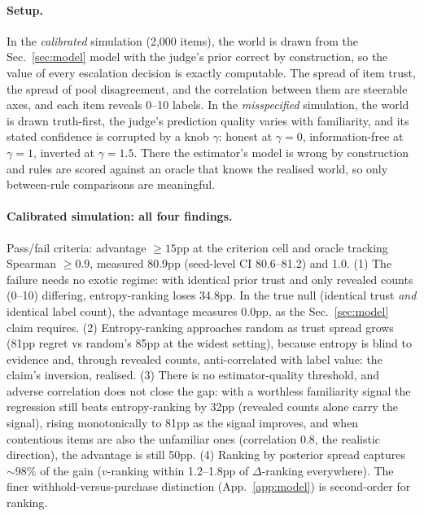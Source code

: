 \documentclass{article}
\newcommand{\secref}[1]{Sec.~\ref{#1}}
\begin{document}
\paragraph{Setup.}
In the \emph{calibrated} simulation (2,000 items), the world is drawn from the
\secref{sec:model} model with the judge's prior correct by construction, so the value of
every escalation decision is exactly computable. The spread of item trust, the spread of
pool disagreement, and the correlation between them are steerable axes, and each item
reveals 0--10 labels. In the \emph{misspecified} simulation, the world is drawn truth-first,
the judge's prediction quality varies with familiarity, and its stated confidence is
corrupted by a knob $\gamma$: honest at $\gamma=0$, information-free
at $\gamma=1$, inverted at $\gamma=1.5$. There the estimator's model is wrong by
construction and rules are scored against an oracle that knows the realised world, so only
between-rule comparisons are meaningful.

\paragraph{Calibrated simulation: all four findings.}
Pass/fail criteria: advantage $\ge 15$pp at the criterion cell and oracle tracking
Spearman $\ge 0.9$, measured 80.9pp (seed-level CI 80.6--81.2) and 1.0.
(1) The failure needs no exotic regime: with identical prior trust and only revealed counts
(0--10) differing, entropy-ranking loses 34.8pp. In the true null (identical trust
\emph{and} identical label count), the advantage measures 0.0pp, as the \secref{sec:model}
claim requires. (2) Entropy-ranking approaches random as trust spread grows (81pp regret vs
random's 85pp at the widest setting), because entropy is blind to evidence and, through
revealed counts, anti-correlated with label value: the claim's inversion, realised.
(3) There is no estimator-quality threshold, and adverse correlation does not close the gap:
with a worthless familiarity signal the regression still beats entropy-ranking by 32pp
(revealed counts alone carry the signal), rising monotonically to 81pp as the signal
improves, and when contentious items are also the unfamiliar ones (correlation 0.8, the
realistic direction), the advantage is still 50pp. (4) Ranking by posterior spread captures
${\sim}98\%$ of the gain ($v$-ranking within 1.2--1.8pp of $\Delta$-ranking everywhere). The
finer withhold-versus-purchase distinction (App.~\ref{app:model}) is second-order for
ranking.
\end{document}
